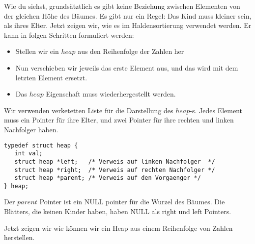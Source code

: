 Wie du siehst, grundsätztlich es gibt keine Beziehung zwischen Elementen von der 
gleichen Höhe des Bäumes. Es gibt nur ein Regel: Das Kind muss kleiner sein, als ihres
Elter. Jetzt zeigen wir, wie es im Haldensortierung verwendet werden.
Er kann in folgen Schritten formuliert werden:
\begin{itemize}
\item Stellen wir ein $heap$ aus den Reihenfolge der Zahlen her
\item Nun verschieben wir jeweils das erste Element aus, und das wird mit dem letzten Element 
ersetzt.
\item Das $heap$ Eigenschaft muss wiederhergestellt werden.
\end{itemize}

Wir verwenden verketetten Liste für die Darstellung des $heap$-s. Jedes Element muss
ein Pointer für ihre Elter, und zwei Pointer für ihre rechten und linken Nachfolger haben.
\begin{lstlisting}
typedef struct heap {
   int val;
   struct heap *left;   /* Verweis auf linken Nachfolger  */
   struct heap *right;  /* Verweis auf rechten Nachfolger */
   struct heap *parent; /* Verweis auf den Vorgaenger */
} heap;
\end{lstlisting}
Der $parent$ Pointer ist ein NULL pointer für die Wurzel des Bäumes. Die Blätters, die keinen
Kinder haben, haben NULL als right und left Pointers.

Jetzt zeigen wir wie können wir ein Heap aus einem Reihenfolge von Zahlen herstellen.

